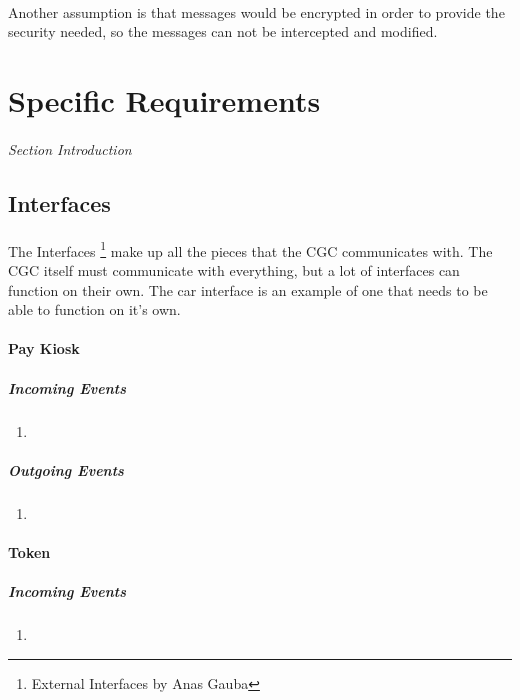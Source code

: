 \documentclass[12pt]{article}
\begin{document}
	\paragraph{} Another assumption is that messages would be encrypted in order 
	to provide the security needed, so the messages can not be intercepted and 
	modified.

\section{Specific Requirements} \label{spec} %
\paragraph{} \textit{Section Introduction}

	\subsection{Interfaces} \label{inter}%
	\paragraph{} The Interfaces \footnote{External Interfaces by Anas Gauba} 
	make up all the pieces that the CGC communicates with. The CGC itself must 
	communicate with everything, 	but a lot of interfaces can function on their own. The 
	car interface is an example of one that needs to be able to function on it's own.
		
	\paragraph{Pay Kiosk}
	\textit{}
	    \subparagraph{Incoming Events}
		\begin{enumerate}
			\item 
		\end{enumerate}
				
	    \subparagraph{Outgoing Events}
		\begin{enumerate}
			\item 
		\end{enumerate}

	\paragraph{Token}
	\textit{}
	    \subparagraph{Incoming Events}
		\begin{enumerate}
	        	\item 
		\end{enumerate}
				
\end{document}
